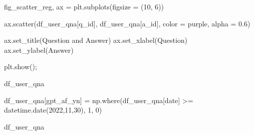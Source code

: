 \documentclass[
  letterpaper,
  DIV=11,
  numbers=noendperiod]{scrartcl}
\newenvironment{Shaded}{\begin{snugshade}}{\end{snugshade}}
\newcommand{\DecValTok}[1]{\textcolor[rgb]{0.68,0.00,0.00}{#1}}
\newcommand{\FloatTok}[1]{\textcolor[rgb]{0.68,0.00,0.00}{#1}}
\newcommand{\NormalTok}[1]{\textcolor[rgb]{0.00,0.23,0.31}{#1}}
\newcommand{\OperatorTok}[1]{\textcolor[rgb]{0.37,0.37,0.37}{#1}}
\newcommand{\StringTok}[1]{\textcolor[rgb]{0.13,0.47,0.30}{#1}}
\begin{document}
\begin{Shaded}
\begin{Highlighting}[]
\NormalTok{fig\_scatter\_reg, ax }\OperatorTok{=}\NormalTok{ plt.subplots(figsize }\OperatorTok{=}\NormalTok{ (}\DecValTok{10}\NormalTok{, }\DecValTok{6}\NormalTok{))}

\NormalTok{ax.scatter(df\_user\_qna[}\StringTok{\textquotesingle{}q\_id\textquotesingle{}}\NormalTok{], df\_user\_qna[}\StringTok{\textquotesingle{}a\_id\textquotesingle{}}\NormalTok{], color }\OperatorTok{=} \StringTok{\textquotesingle{}purple\textquotesingle{}}\NormalTok{, alpha }\OperatorTok{=} \FloatTok{0.6}\NormalTok{)}

\NormalTok{ax.set\_title(}\StringTok{\textquotesingle{}Question and Answer\textquotesingle{}}\NormalTok{)}
\NormalTok{ax.set\_xlabel(}\StringTok{\textquotesingle{}Question\textquotesingle{}}\NormalTok{)}
\NormalTok{ax.set\_ylabel(}\StringTok{\textquotesingle{}Answer\textquotesingle{}}\NormalTok{)}


\NormalTok{plt.show()}\OperatorTok{;}
\end{Highlighting}
\end{Shaded}

\begin{Shaded}
\begin{Highlighting}[]
\NormalTok{df\_user\_qna}
\end{Highlighting}
\end{Shaded}

\begin{Shaded}
\begin{Highlighting}[]
\NormalTok{df\_user\_qna[}\StringTok{\textquotesingle{}gpt\_af\_yn\textquotesingle{}}\NormalTok{] }\OperatorTok{=}\NormalTok{ np.where(df\_user\_qna[}\StringTok{\textquotesingle{}date\textquotesingle{}}\NormalTok{] }\OperatorTok{\textgreater{}=}\NormalTok{ datetime.date(}\DecValTok{2022}\NormalTok{,}\DecValTok{11}\NormalTok{,}\DecValTok{30}\NormalTok{), }\DecValTok{1}\NormalTok{, }\DecValTok{0}\NormalTok{)}
\end{Highlighting}
\end{Shaded}

\begin{Shaded}
\begin{Highlighting}[]
\NormalTok{df\_user\_qna}
\end{Highlighting}
\end{Shaded}
\end{document}
